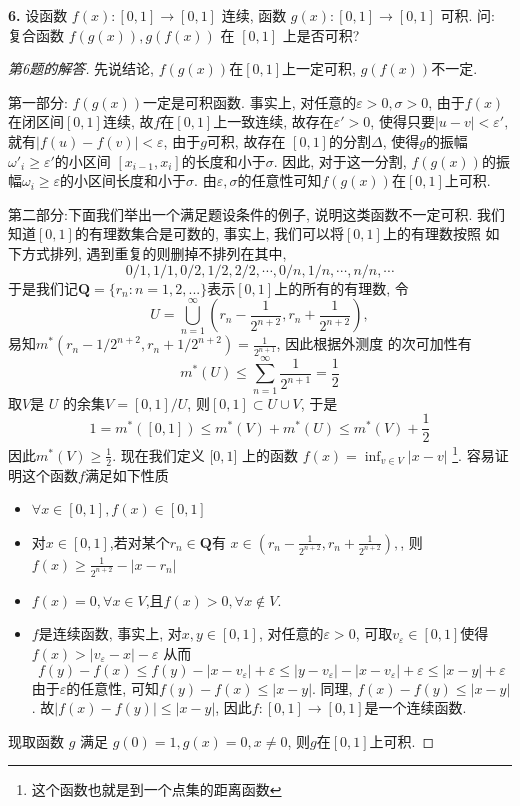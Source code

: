 \documentclass[a4paper,12pt]{article}
\begin{document}
\noindent \textbf{6.} 设函数 $f(x):[0,1]\to [0,1]$ 连续, 函数 $g(x):[0,1]\to [0,1]$ 可积. 
问: 复合函数 $f(g(x)),g(f(x))$ 在 $[0,1]$ 上是否可积?
\begin{proof}[第6题的解答]
  先说结论, $f(g(x))$在$[0,1]$上一定可积, $g(f(x))$不一定.

  \noindent 第一部分: $f(g(x))$一定是可积函数. 事实上, 对任意的$\varepsilon>0,\sigma>0$, 
  由于$f(x)$在闭区间$[0,1]$连续, 故$f$在$[0,1]$上一致连续, 故存在$\varepsilon'>0$,
  使得只要$|u-v|<\varepsilon',$就有$|f(u)-f(v)|<\varepsilon$, 由于$g$可积, 故存在
  $[0,1]$的分割$\Delta$, 使得$g$的振幅$\omega'_i\geq \varepsilon'$的小区间
  $[x_{i-1},x_i]$的长度和小于$\sigma$. 因此, 对于这一分割, 
  $f(g(x))$的振幅$\omega_i\geq \varepsilon$的小区间长度和小于$\sigma$.
  由$\varepsilon,\sigma$的任意性可知$f(g(x))$在$[0,1]$上可积.

  \noindent 第二部分:下面我们举出一个满足题设条件的例子, 说明这类函数不一定可积.
  我们知道$[0,1]$的有理数集合是可数的, 事实上, 我们可以将$[0,1]$上的有理数按照
  如下方式排列, 遇到重复的则删掉不排列在其中,
  \[0/1,1/1,0/2,1/2,2/2,\cdots,0/n,1/n,\cdots,n/n,\cdots\]
  于是我们记$ \mathbf Q=\{r_n:n=1,2,...\}$表示$[0,1]$上的所有的有理数, 令
  \[U=\bigcup_{n=1}^\infty(r_n-\frac{1}{2^{n+2}},r_n+\frac{1}{2^{n+2}}),\] 
  易知$m^*{(r_n-1/{2^{n+2}},r_n+1/{2^{n+2}})}=\frac{1}{2^{n+1}}$, 因此根据外测度
  的次可加性有
  \[m^*(U)\leq \sum_{n=1}^{\infty}\frac{1}{2^{n+1}}=\frac{1}{2}\]
  取$V $是 $U$ 的余集$V=[0,1]/U$, 则$[0,1]\subset U\cup V$, 于是
  \[1=m^*([0,1])\leq m^*(V)+m^*(U)\leq m^*(V)+\frac{1}{2}\]
  因此$m^*(V)\geq \frac{1}{2}$.
  现在我们定义 $\mathbf [0,1]$ 上的函数 $f(x)=\inf_{v\in V}|x-v|$
  \footnote{这个函数也就是到一个点集的距离函数}.
  容易证明这个函数$f$满足如下性质
  \begin{itemize}
    \item $\forall x\in[0,1],f(x)\in[0,1]$
    \item 对$x\in[0,1]$,若对某个$r_n\in \mathbf Q$有
      $x\in(r_n-\frac{1}{2^{n+2}},r_n+\frac{1}{2^{n+2}}),$, 
      则$f(x)\geq \frac{1}{2^{n+2}}-|x-r_n|$
    \item $f(x)=0,\forall x\in V$,且$f(x)>0,\forall x\notin V$.
    \item $f$是连续函数, 事实上, 对$x,y\in[0,1]$, 对任意的$\varepsilon>0$, 
      可取$v_\varepsilon\in[0,1]$使得$f(x)>|v_\varepsilon-x|-\varepsilon$
      从而
      \[f(y)-f(x)\leq f(y)-|x-v_\varepsilon|+\varepsilon\leq |y-v_\varepsilon|-|x-v_\varepsilon|+\varepsilon\leq|x-y|+\varepsilon\]
      由于$\varepsilon$的任意性, 可知$f(y)-f(x)\leq |x-y|$. 
      同理, $f(x)-f(y)\leq |x-y|$. 故$|f(x)-f(y)|\leq |x-y|$, 
      因此$f:[0,1]\to[0,1]$是一个连续函数.
  \end{itemize}
  现取函数 $g$ 满足 $g(0)=1, g(x)=0, x\neq0$, 则$g$在$[0,1]$上可积. 


\end{proof}
\end{document}
